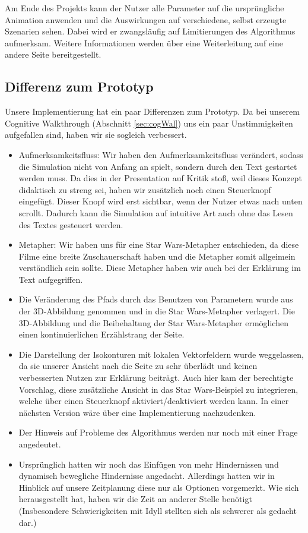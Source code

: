 Am Ende des Projekts kann der Nutzer alle Parameter auf die ursprüngliche Animation anwenden und die Auswirkungen auf verschiedene, selbst erzeugte Szenarien sehen. Dabei wird er zwangsläufig auf Limitierungen des Algorithmus aufmerksam. Weitere Informationen werden über eine Weiterleitung auf eine andere Seite bereitgestellt.


\subsection{Differenz zum Prototyp}
Unsere Implementierung hat ein paar Differenzen zum Prototyp.
Da bei unserem Cognitive Walkthrough (Abschnitt \vref{sec:cogWal}) uns ein paar Unstimmigkeiten aufgefallen sind, haben wir sie sogleich verbessert.
\begin{itemize}
	\item Aufmerksamkeitsfluss: Wir haben den Aufmerksamkeitsfluss verändert, sodass die Simulation nicht von Anfang an spielt, sondern durch den Text gestartet werden muss. Da dies in der Presentation auf Kritik stoß, weil dieses Konzept didaktisch zu streng sei, haben wir zusätzlich noch einen Steuerknopf eingefügt. Dieser Knopf wird erst sichtbar, wenn der Nutzer etwas nach unten scrollt. Dadurch kann die Simulation auf intuitive Art auch ohne das Lesen des Textes gesteuert werden.
	\item Metapher: Wir haben uns für eine Star Wars-Metapher entschieden, da diese Filme eine breite Zuschauerschaft haben und die Metapher somit allgeimein verständlich sein sollte. Diese Metapher haben wir auch bei der Erklärung im Text aufgegriffen.
	\item Die Veränderung des Pfads durch das Benutzen von Parametern wurde aus der 3D-Abbildung genommen und in die Star Wars-Metapher verlagert. Die 3D-Abbildung und die Beibehaltung der Star Wars-Metapher ermöglichen einen kontinuierlichen Erzählstrang der Seite.
	\item Die Darstellung der Isokonturen mit lokalen Vektorfeldern wurde weggelassen, da sie unserer Ansicht nach die Seite zu sehr überlädt und keinen verbesserten Nutzen zur Erklärung beiträgt. Auch hier kam der berechtigte Vorschlag, diese zusätzliche Ansicht in das Star Wars-Beispiel zu integrieren, welche über einen Steuerknopf aktiviert/deaktiviert werden kann. In einer nächsten Version wäre über eine Implementierung nachzudenken.
	\item Der Hinweis auf Probleme des Algorithmus werden nur noch mit einer Frage angedeutet. 
	\item Ursprünglich hatten wir noch das Einfügen von mehr Hindernissen und dynamisch bewegliche Hindernisse angedacht. Allerdings hatten wir in Hinblick auf unsere Zeitplanung diese nur als Optionen vorgemerkt. Wie sich herausgestellt hat, haben wir die Zeit an anderer Stelle benötigt (Insbesondere Schwierigkeiten mit Idyll stellten sich als schwerer als gedacht dar.)
\end{itemize}

